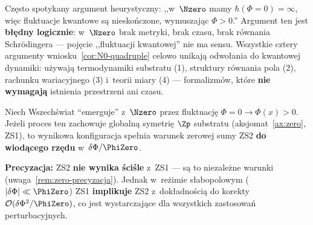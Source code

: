 \begin{remark}%
\label{rem:N0-not-quantum}
Cz\k{e}sto spotykany argument heurystyczny: ,,w~$\Nzero$
mamy $\hbar(\Phi\!=\!0) = \infty$, wi\k{e}c fluktuacje kwantowe
s\k{a} niesko\'nczone, wymuszaj\k{a}c $\Phi > 0$.''
Argument ten jest \textbf{b\l{}\k{e}dny logicznie}:
w~$\Nzero$ brak metryki, brak czasu, brak r\'ownania
Schr\"odingera --- poj\k{e}cie ,,fluktuacji kwantowej''
nie ma sensu. Wszystkie cztery argumenty
wniosku~\ref{cor:N0-quadruple} celowo unikaj\k{a}
odwo\l{}ania do kwantowej dynamiki: u\.zywaj\k{a}
termodynamiki substratu (1), struktury r\'ownania pola (2),
rachunku wariacyjnego (3) i~teorii miary (4) ---
formalizm\'ow, kt\'ore \textbf{nie wymagaj\k{a}}
istnienia przestrzeni ani czasu.
\end{remark}

\begin{proposition}\label{prop:N0-ZS-emergence}
Niech Wszech\'swiat ``emerguje'' z~$\Nzero$ przez
fluktuacj\k{e} $\Phi = 0 \to \Phi(x) > 0$.
Je\.zeli proces ten zachowuje globaln\k{a}
symetri\k{e} $\Zp$ substratu (aksjomat~\ref{ax:zero}, ZS1),
to wynikowa konfiguracja spe\l{}nia warunek zerowej sumy ZS2
\textbf{do wiod\k{a}cego rz\k{e}du} w~$\delta\Phi/\PhiZero$.

\medskip\noindent
\textbf{Precyzacja:} ZS2 \textbf{nie wynika \'sci\'sle}
z~ZS1 --- s\k{a} to niezale\.zne warunki (uwaga~\ref{rem:zero-precyzacja}).
Jednak w~re\.zimie s\l{}abopolowym ($|\delta\Phi| \ll \PhiZero$)
ZS1 \textbf{implikuje} ZS2 z~dok\l{}adno\'sci\k{a} do korekty
$\mathcal{O}(\delta\Phi^2/\PhiZero)$, co jest wystarczaj\k{a}ce
dla wszystkich zastosowa\'n perturbacyjnych.
\end{proposition}

